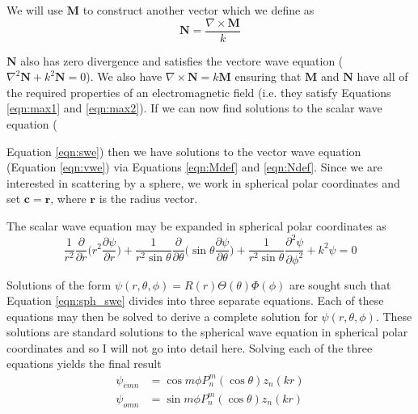 \noindent We will use $\mathbf{M}$ to construct another vector which we define as 
\begin{equation}
\label{eqn:Ndef}
\mathbf{N}=\frac{\nabla \times \mathbf{M}}{k}
\end{equation}

\noindent $\mathbf{N}$ also has zero divergence and satisfies the vectore wave equation ($\nabla^2\mathbf{N}+k^2\mathbf{N}=0$).  We also have $\nabla \times \mathbf{N} = k\mathbf{M}$ ensuring that $\mathbf{M}$ and $\mathbf{N}$ have all of the required properties of an electromagnetic field (i.e. they satisfy Equations \ref{eqn:max1} and \ref{eqn:max2}).  If we can now find solutions to the scalar wave equation ({Equation \ref{eqn:swe}) then we have solutions to the vector wave equation (Equation \ref{eqn:vwe}) via Equations \ref{eqn:Mdef} and \ref{eqn:Ndef}.    Since we are interested in scattering by a sphere, we work in spherical polar coordinates and set $\mathbf{c}=\mathbf{r}$, where $\mathbf{r}$ is the radius vector.

The scalar wave equation may be expanded in spherical polar coordinates as
\begin{equation}
\label{eqn:sph_swe}
\frac{1}{r^2}\frac{\partial}{\partial r}\Big(r^2\frac{\partial \psi}{\partial r} \Big) + \frac{1}{r^2\sin\theta}\frac{\partial}{\partial \theta}\Big(\sin\theta\frac{\partial \psi}{\partial \theta}\Big) + \frac{1}{r^2\sin\theta}\frac{\partial^2\psi}{\partial\phi^2}+k^2\psi=0
\end{equation}


\noindent Solutions of the form $\psi(r,\theta,\phi)=R(r)\Theta(\theta)\Phi(\phi)$ are sought such that Equation \ref{eqn:sph_swe} divides into three separate equations.  Each of these equations may then be solved to derive a complete solution for $\psi(r,\theta,\phi)$.  These solutions are standard solutions to the spherical wave equation in spherical polar coordinates and so I will not go into detail here.  Solving each of the three equations yields the final result
\begin{align}
\label{eqn:e_soln}
\psi_{emn}&=\cos m\phi P_n^m(\cos\theta)z_n(kr) \\
\label{eqn:o_soln}
\psi_{omn}&=\sin m\phi P_n^m(\cos\theta)z_n(kr) 
\end{align}

}
